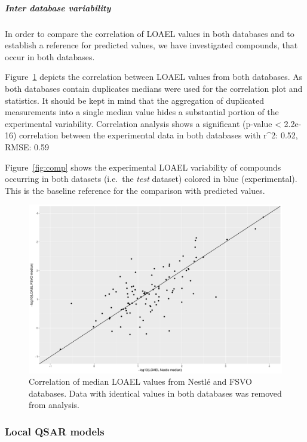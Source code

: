 \documentclass[]{achemso}
\let\oldsubparagraph\subparagraph
\renewcommand{\subparagraph}[1]{\oldsubparagraph{#1}\mbox{}}
\begin{document}
\subparagraph{Inter database
variability}\label{inter-database-variability}

In order to compare the correlation of LOAEL values in both databases
and to establish a reference for predicted values, we have investigated
compounds, that occur in both databases.

Figure~\ref{fig:datacorr} depicts the correlation between LOAEL values
from both databases. As both databases contain duplicates medians were
used for the correlation plot and statistics. It should be kept in mind
that the aggregation of duplicated measurements into a single median
value hides a substantial portion of the experimental variability.
Correlation analysis shows a significant (p-value \textless{} 2.2e-16)
correlation between the experimental data in both databases with r\^{}2:
0.52, RMSE: 0.59

Figure~\ref{fig:comp} shows the experimental LOAEL variability of
compounds occurring in both datasets (i.e.~the \emph{test} dataset)
colored in blue (experimental). This is the baseline reference for the
comparison with predicted values.

\begin{figure}
\centering
\includegraphics{figures/median-correlation.pdf}
\caption{Correlation of median LOAEL values from Nestlé and FSVO
databases. Data with identical values in both databases was removed from
analysis.}\label{fig:datacorr}
\end{figure}

\subsubsection{Local QSAR models}\label{local-qsar-models}
\end{document}
